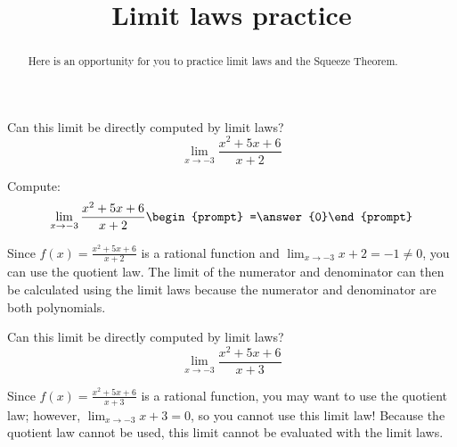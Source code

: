 \documentclass[handout]{ximera}
\title{Limit laws practice}
\begin{document}
\begin{abstract}
Here is an opportunity for you to practice limit laws and the Squeeze Theorem.
\end{abstract}
\maketitle

\begin{exercise}
  Can this limit be directly computed by limit laws?
  \[
  \displaystyle\lim_{x\to -3}\frac{x^2+5x+6}{x+2} 
  \]
  \begin{multipleChoice}
  \end{multipleChoice}
  \begin{question}
    Compute:
    \[
    \displaystyle\lim_{x\to -3}\frac{x^2+5x+6}{x+2} \begin{prompt} =\answer{0}\end{prompt}
    \]
    \begin{feedback}
      Since $f(x)=\frac{x^2+5x+6}{x+2}$ is a rational function and
      $\displaystyle\lim_{x\to -3} x+2 =-1 \neq 0$, you can use the quotient law.  The limit of the numerator and denominator can then be calculated using the limit laws because the numerator and denominator are both polynomials. 
    \end{feedback}
  \end{question}
\end{exercise}

\begin{exercise}
  Can this limit be directly computed by limit laws?
  \[
  \displaystyle\lim_{x\to -3}\frac{x^2+5x+6}{x+3} 
  \]
  \begin{multipleChoice}
    
    \begin{feedback}[correct]
      Since $f(x)=\frac{x^2+5x+6}{x+3}$ is a rational function, you may want to use the quotient law; however, $\displaystyle\lim_{x\to -3} x+3 = 0$, so you cannot use this limit law!  Because the quotient law cannot be used, this limit cannot be evaluated with the limit laws. 
    \end{feedback}
    
  \end{multipleChoice}

\end{exercise}
\end{document}
